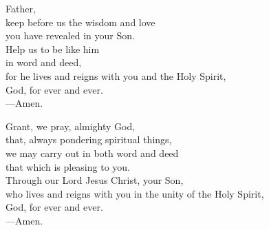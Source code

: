 \prayer


\begin{prayerverse}
Father,\\
keep before us the wisdom and love\\
you have revealed in your Son.\\
Help us to be like him\\
in word and deed,\\
for he lives and reigns with you and the Holy Spirit,\\
God, for ever and ever.\\
{\color{red}---\thinspace}Amen.
\end{prayerverse}


\begin{prayerverse}
Grant, we pray, almighty God,\\
that, always pondering spiritual things,\\
we may carry out in both word and deed\\
that which is pleasing to you.\\
Through our Lord Jesus Christ, your Son,\\
who lives and reigns with you in the unity of the Holy Spirit,\\
God, for ever and ever.\\
{\color{red}---\thinspace}Amen.
\end{prayerverse}

